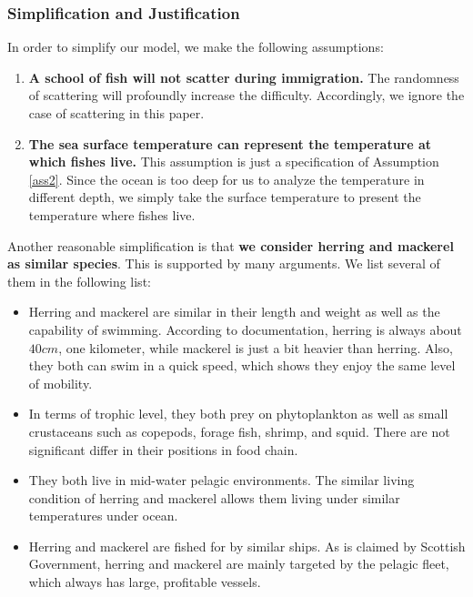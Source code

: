\documentclass{mcmthesis}
\begin{document}
\subsubsection{Simplification and Justification}\label{S4s21}
	In order to simplify our model, we make the following assumptions:
\begin{enumerate}[1)]
	\item {\bfseries A school of fish will not scatter during immigration.} The randomness of scattering will profoundly increase the difficulty. Accordingly, we ignore the case of scattering in this paper.
    \item {\bfseries The sea surface temperature can represent the temperature at which fishes live.} This assumption is just a specification of Assumption \ref{ass2}. Since the ocean is too deep for us to analyze the temperature in different depth, we simply take the surface temperature to present the temperature where fishes live.
\end{enumerate}	\par
    Another reasonable simplification is that \textbf{we consider herring and mackerel as similar species}. This is supported by many arguments. We list several of them in the following list:
\begin{itemize}
	\item Herring and mackerel are similar in their length and weight as well as the capability of swimming. According to documentation, herring is always  about $40cm$, one kilometer, while mackerel is just a bit heavier than herring. Also, they both can swim in a quick speed, which shows they enjoy the same level of mobility\cite{Wiki_herring}\cite{Wiki_mackerel}.
	\item In terms of trophic level, they both prey on phytoplankton as well as small crustaceans such as copepods, forage fish, shrimp, and squid. There are not significant differ in their positions in food chain.
	\item They both live in mid-water pelagic environments\cite{Wiki_herring}\cite{Wiki_mackerel}. The similar living condition of herring and mackerel allows them living under similar temperatures under ocean. 
	\item Herring and mackerel are fished for by similar ships. As is claimed by Scottish Government, herring and mackerel are mainly targeted by the pelagic fleet, which always has large, profitable vessels\cite{scotmarine}. 
\end{itemize}
\end{document}
